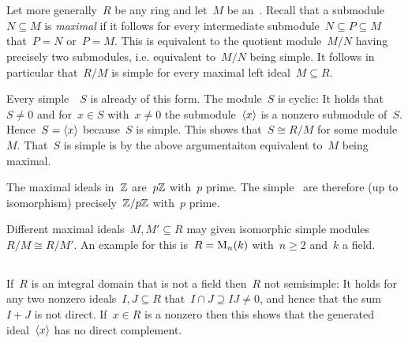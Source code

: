 \section{}





\subsection{}
\label{classification of simple modules}

Let more generally~$R$ be any ring and let~$M$ be an~{}.
Recall that a submodule~$N \subseteq M$ is \emph{maximal} if it follows for every intermediate submodule~$N \subseteq P \subseteq M$ that~$P= N$ or~$P = M$.
This is equivalent to the quotient module~$M/N$ having precisely two submodules, i.e. equivalent to~$M/N$ being simple.
It follows in particular that~$R/M$ is simple for every maximal left ideal~$M \subseteq R$.

Every simple~~$S$ is already of this form.
The module~$S$ is cyclic:
It holds that~$S \neq 0$ and for~$x \in S$ with~$x \neq 0$ the submodule~$\langle x\rangle$ is a nonzero submodule of~$S$.
Hence~$S = \langle x\rangle$ because~$S$ is simple.
This shows that~$S \cong R/M$ for some module~$M$.
That~$S$ is simple is by the above argumentaiton equivalent to~$M$ being maximal.

The maximal ideals in~$\Integer$ are~$p \mathbb{Z}$ with~$p$ prime.
The simple~{\modules{$\Integer$}} are therefore (up to isomorphism) precisely~$\mathbb{Z}/p\mathbb{Z}$ with~$p$ prime.

\begin{warning}
  Different maximal ideals~$M, M' \subseteq R$ may given isomorphic simple modules~$R/M \cong R/M'$.
  An example for this is~$R = \operatorname{M}_{n}(k)$ with~$n \geq 2$ and~$k$ a field.
\end{warning}





\subsection{}

If~$R$ is an integral domain that is not a field then~$R$ not semisimple:
It holds for any two nonzero ideals~$I, J \subseteq R$ that~$I \cap J \supseteq IJ \neq 0$, and hence that the sum~$I + J$ is not direct.
If~$x \in R$ is a nonzero  then this shows that the generated ideal~$\langle x\rangle$ has no direct complement.


